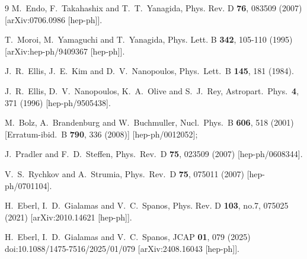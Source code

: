 \documentclass[aps,prev,twocolumn,preprintnumbers,floatfix,nofootinbib]{revtex4-1}
\begin{document}
\begin{thebibliography}{9}
M.~Endo, F.~Takahashix and T.~T.~Yanagida,
Phys. Rev. D \textbf{76}, 083509 (2007)
[arXiv:0706.0986 [hep-ph]].

T.~Moroi, M.~Yamaguchi and T.~Yanagida,
Phys. Lett. B \textbf{342}, 105-110 (1995)
[arXiv:hep-ph/9409367 [hep-ph]].



  J.~R.~Ellis, J.~E.~Kim and D.~V.~Nanopoulos,
  Phys.\ Lett.\ B {\bf 145}, 181 (1984).

  J.~R.~Ellis, D.~V.~Nanopoulos, K.~A.~Olive and S.~J.~Rey,
  Astropart.\ Phys.\  {\bf 4}, 371 (1996)
  [hep-ph/9505438].

   M.~Bolz, A.~Brandenburg and W.~Buchmuller,
  Nucl.\ Phys.\ B {\bf 606}, 518 (2001)
  [Erratum-ibid.\ B {\bf 790}, 336 (2008)]
  [hep-ph/0012052];

  J.~Pradler and F.~D.~Steffen,
  Phys.\ Rev.\ D {\bf 75}, 023509 (2007)
  [hep-ph/0608344].

   V.~S.~Rychkov and A.~Strumia,
  Phys.\ Rev.\ D {\bf 75}, 075011 (2007)
  [hep-ph/0701104].


H.~Eberl, I.~D.~Gialamas and V.~C.~Spanos,
Phys. Rev. D \textbf{103}, no.7, 075025 (2021)
[arXiv:2010.14621 [hep-ph]].

H.~Eberl, I.~D.~Gialamas and V.~C.~Spanos,
JCAP \textbf{01}, 079 (2025)
doi:10.1088/1475-7516/2025/01/079
[arXiv:2408.16043 [hep-ph]].





\end{thebibliography}
\end{document}
